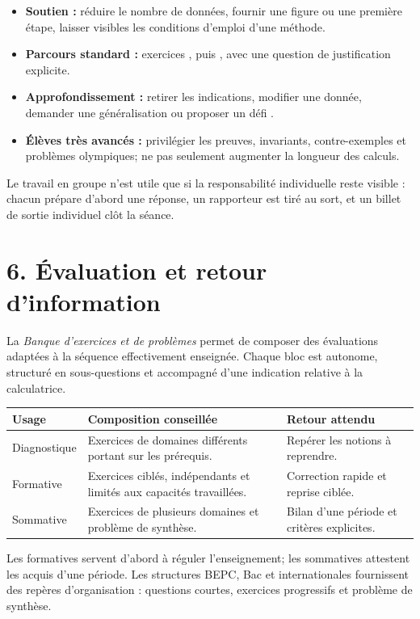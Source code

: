 \begin{itemize}
  \item \textbf{Soutien :} réduire le nombre de données, fournir une figure ou une
  première étape, laisser visibles les conditions d'emploi d'une méthode.
  \item \textbf{Parcours standard :} exercices , puis , avec une
  question de justification explicite.
  \item \textbf{Approfondissement :} retirer les indications, modifier une donnée,
  demander une généralisation ou proposer un défi .
  \item \textbf{Élèves très avancés :} privilégier les preuves, invariants,
  contre-exemples et problèmes olympiques; ne pas seulement augmenter la longueur
  des calculs.
\end{itemize}

Le travail en groupe n'est utile que si la responsabilité individuelle reste
visible : chacun prépare d'abord une réponse, un rapporteur est tiré au sort, et
un billet de sortie individuel clôt la séance.

\section*{6. Évaluation et retour d'information}

La \emph{Banque d'exercices et de problèmes} permet de composer des évaluations
adaptées à la séquence effectivement enseignée. Chaque bloc est autonome,
structuré en sous-questions et accompagné d'une indication relative à la
calculatrice.

\begin{center}
\small
\begin{tabularx}{\textwidth}{@{}p{2.5cm}p{5.2cm}X@{}}
\toprule
Usage & Composition conseillée & Retour attendu \\
\midrule
Diagnostique & Exercices de domaines différents portant sur les prérequis. & Repérer les notions à reprendre. \\
Formative & Exercices ciblés, indépendants et limités aux capacités travaillées. & Correction rapide et reprise ciblée. \\
Sommative & Exercices de plusieurs domaines et problème de synthèse. & Bilan d'une période et critères explicites. \\
\bottomrule
\end{tabularx}
\end{center}

Les formatives servent d'abord à réguler l'enseignement; les sommatives attestent
les acquis d'une période. Les structures BEPC, Bac et internationales fournissent
des repères d'organisation : questions courtes, exercices progressifs et problème
de synthèse.

